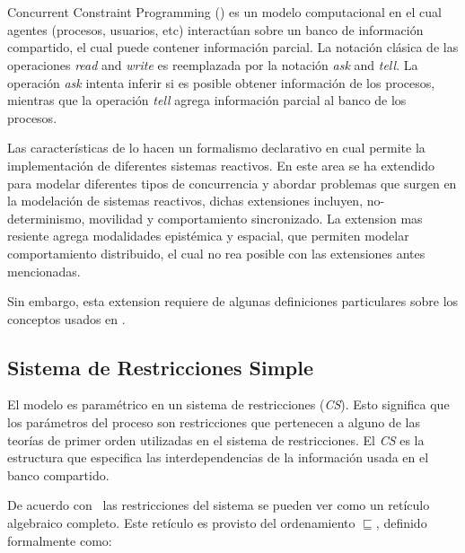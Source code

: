 \chapter{\SCCP}
\label{cap3.sccp}      

Concurrent Constraint Programming (\textbf{\CCP}) es un modelo computacional en el cual agentes (procesos, usuarios, etc) interact\'uan sobre un banco de informaci\'on compartido, el cual puede contener informaci\'on parcial. La notaci\'on cl\'asica de las operaciones \textit{read} and \textit{write} es reemplazada por la notaci\'on \textit{ask} and \textit{tell}. La operaci\'on \textit{ask} intenta inferir si es posible obtener informaci\'on de los procesos, mientras que la operaci\'on \textit{tell} agrega informaci\'on parcial al banco de los procesos.

Las caracter\'isticas de \textbf{\CCP} lo hacen un formalismo declarativo en cual permite la implementaci\'on de diferentes sistemas reactivos. En este area \textbf{\CCP} se ha extendido para modelar diferentes tipos de concurrencia y abordar problemas que surgen en la modelaci\'on de sistemas reactivos, dichas extensiones incluyen, no-determinismo, movilidad y comportamiento sincronizado. La extension mas resiente agrega modalidades epist\'emica y espacial, que permiten modelar comportamiento distribuido, el cual no rea posible con las extensiones antes mencionadas.

Sin embargo, esta extension requiere de algunas definiciones particulares sobre los conceptos usados en \textbf{\CCP}.

\section{Sistema de Restricciones Simple}
\label{srs.cap3}

El modelo \textbf{\CCP} es param\'etrico en un sistema de restricciones (\textit{CS}). Esto significa que los par\'ametros del proceso son restricciones que pertenecen a alguno de las teor\'ias de primer orden utilizadas en el sistema de restricciones. El \textit{CS} es la estructura que especifica las interdependencias de la informaci\'on usada en el banco compartido. 

De acuerdo con~\cite{DEBOER199537} las restricciones del sistema se pueden ver como un ret\'iculo algebraico completo. Este ret\'iculo es provisto del ordenamiento $\sqsubseteq$, definido formalmente como:

